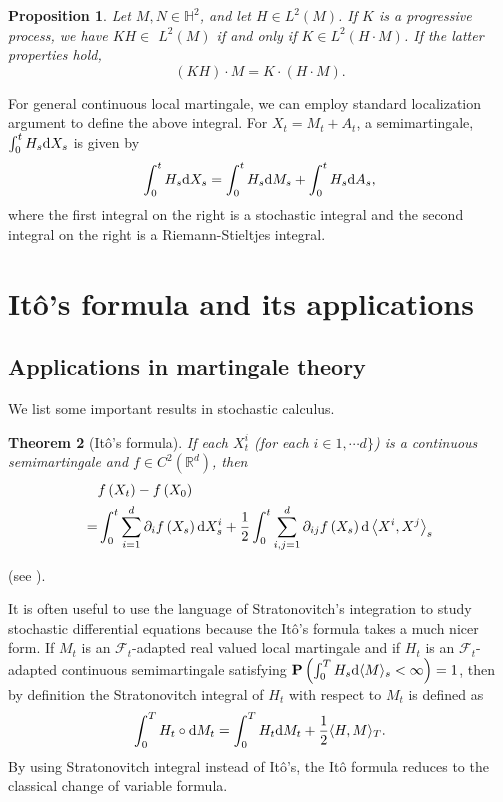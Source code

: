 \documentclass[twoside, 12pt]{book}
\numberwithin{equation}{chapter}
\newtheorem{theorem}{Theorem}[section]
\newtheorem{proposition}[theorem]{Proposition}
\def\cF{{\mathcal F}}
\def\mH{{\mathbb H}}
\def\mR{{\mathbb R}}
\def\bP{{\mathbf P}}
\def\<{\langle}
\def\>{\rangle}
\def\d{\text{\rm{d}}}
\begin{document}
	\begin{proposition}
		Let $M, N\in\mH^2$, and let $H \in L^2(M)$. If $K$ is a progressive process, we have $K H \in$ $L^2(M)$ if and only if $K \in L^2(H \cdot M)$. If the latter properties hold,
		$$
		(K H) \cdot M=K \cdot(H \cdot M) .
		$$
	\end{proposition}
	
	
	
	
	
	For general continuous local martingale, we can employ standard localization argument to define the above integral. For $X_t=M_t+A_t$, a semimartingale, $\int_0^t H_s \d X_s$ is given by
	$$
	\int_0^t H_s \d X_s=\int_0^t H_s \d M_s+\int_0^t H_s \d A_s, 
	$$
	where the first integral on the right is a stochastic integral and the second integral on the right is a Riemann-Stieltjes integral.

	
	\section{It\^o's formula and its applications}
	
	\subsection{Applications in martingale theory}
	We list some important results in stochastic calculus. 
	\begin{theorem}[It\^o's formula]
		If each $X_t^i$ (for each $i\in 1,\cdots d\}$) is a continuous semimartingale and $f\in C^2(\mR^d)$, then \begin{equation}\label{eq:Ito}
			\begin{aligned}
				&f\left(X_t\right)  -f\left(X_0\right) \\
				= & \int_0^t \sum_{i=1}^d \partial_i f\left(X_s\right) \d X_s^i+\frac{1}{2} \int_0^t \sum_{i, j=1}^d \partial_{i j} f\left(X_s\right) \d\left\langle X^i, X^j\right\rangle_s
			\end{aligned}
		\end{equation}
	\end{theorem}
	(see \cite[Theorem 13.5]{Huang}). 

 It is often useful to use the language of Stratonovitch's integration to study stochastic differential equations because the Itô’s formula takes a much nicer form. If $M_t$ is an $\cF_t$-adapted real valued local martingale and if $H_t$ is an $\cF_t$-adapted continuous semimartingale satisfying $\bP\left(\int_0^TH_s\d \<M\>_s<\infty\right)=1$, then by definition the Stratonovitch integral of  $H_t$ with respect to $M_t$ is defined as
\[
    \int_0^T H_t \circ \d  M_t =\int_0^T H_t\d M_t+\frac{1}{2} \langle H, M \rangle_T. 
\]
By using Stratonovitch integral instead of Itô’s, the Itô formula reduces to the classical change of variable formula.
\end{document}
